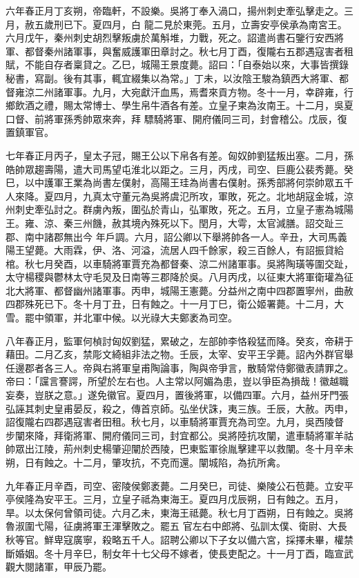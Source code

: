 \begin{pinyinscope}
 六年春正月丁亥朔，帝臨軒，不設樂。吳將丁奉入渦口，揚州刺史牽弘擊走之。三月，赦五歲刑已下。夏四月，白
 龍二見於東莞。五月，立壽安亭侯承為南宮王。六月戊午，秦州刺史胡烈擊叛虜於萬斛堆，力戰，死之。詔遣尚書石鑒行安西將軍、都督秦州諸軍事，與奮威護軍田章討之。秋七月丁酉，復隴右五郡遇寇害者租賦，不能自存者稟貸之。乙巳，城陽王景度薨。詔曰：「自泰始以來，大事皆撰錄秘書，寫副。後有其事，輒宜綴集以為常。」丁未，以汝陰王駿為鎮西大將軍、都督雍涼二州諸軍事。九月，大宛獻汗血馬，焉耆來貢方物。冬十一月，幸辟雍，行鄉飲酒之禮，賜太常博士、學生帛牛酒各有差。立皇子柬為汝南王。十二月，吳夏口督、前將軍孫秀帥眾來奔，拜
 驃騎將軍、開府儀同三司，封會稽公。戊辰，復置鎮軍官。



 七年春正月丙子，皇太子冠，賜王公以下帛各有差。匈奴帥劉猛叛出塞。二月，孫皓帥眾趨壽陽，遣大司馬望屯淮北以距之。三月，丙戌，司空、巨鹿公裴秀薨。癸巳，以中護軍王業為尚書左僕射，高陽王珪為尚書右僕射。孫秀部將何崇帥眾五千人來降。夏四月，九真太守董元為吳將虞氾所攻，軍敗，死之。北地胡寇金城，涼州刺史牽弘討之。群虜內叛，圍弘於青山，弘軍敗，死之。五月，立皇子憲為城陽王。雍、涼、秦三州饑，赦其境內殊死以下。閏月，大雩，太官減膳。詔交趾三郡、南中諸郡無出今
 年戶調。六月，詔公卿以下舉將帥各一人。辛丑，大司馬義陽王望薨。大雨霖，伊、洛、河溢，流居人四千餘家，殺三百餘人，有詔振貸給棺。秋七月癸酉，以車騎將軍賈充為都督秦、涼二州諸軍事。吳將陶璜等圍交趾，太守楊稷與鬱林太守毛炅及日南等三郡降於吳。八月丙戌，以征東大將軍衛瓘為征北大將軍、都督幽州諸軍事。丙申，城陽王憲薨。分益州之南中四郡置寧州，曲赦四郡殊死已下。冬十月丁丑，日有蝕之。十一月丁巳，衛公姬署薨。十二月，大雪。罷中領軍，并北軍中候。以光祿大夫鄭袤為司空。



 八年春正月，監軍何楨討匈奴劉猛，累破之，左部帥李恪殺猛而降。癸亥，帝耕于藉田。二月乙亥，禁彫文綺組非法之物。壬辰，太宰、安平王孚薨。詔內外群官舉任邊郡者各三人。帝與右將軍皇甫陶論事，陶與帝爭言，散騎常侍鄭徽表請罪之。帝曰：「讜言謇諤，所望於左右也。人主常以阿媚為患，豈以爭臣為損哉！徽越職妄奏，豈朕之意。」遂免徽官。夏四月，置後將軍，以備四軍。六月，益州牙門張弘誣其刺史皇甫晏反，殺之，傳首京師。弘坐伏誅，夷三族。壬辰，大赦。丙申，詔復隴右四郡遇寇害者田租。秋七月，以車騎將軍賈充為司空。九月，吳西陵督
 步闡來降，拜衛將軍、開府儀同三司，封宜都公。吳將陸抗攻闡，遣車騎將軍羊祜帥眾出江陵，荊州刺史楊肇迎闡於西陵，巴東監軍徐胤擊建平以救闡。冬十月辛未朔，日有蝕之。十二月，肇攻抗，不克而還。闡城陷，為抗所禽。



 九年春正月辛酉，司空、密陵侯鄭袤薨。二月癸巳，司徒、樂陵公石苞薨。立安平亭侯隆為安平王。三月，立皇子祗為東海王。夏四月戊辰朔，日有蝕之。五月，旱。以太保何曾領司徒。六月乙未，東海王祗薨。秋七月丁酉朔，日有蝕之。吳將魯淑圍弋陽，征虜將軍王渾擊敗之。罷五
 官左右中郎將、弘訓太僕、衛尉、大長秋等官。鮮卑寇廣寧，殺略五千人。詔聘公卿以下子女以備六宮，採擇未畢，權禁斷婚姻。冬十月辛巳，制女年十七父母不嫁者，使長吏配之。十一月丁酉，臨宣武觀大閱諸軍，甲辰乃罷。




\end{pinyinscope}
